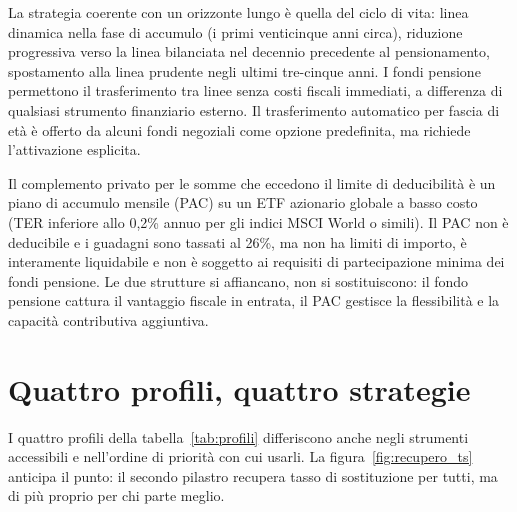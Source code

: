 \medskip
\noindent
La strategia coerente con un orizzonte lungo è quella del ciclo di
vita: linea dinamica nella fase di accumulo (i primi venticinque
anni circa), riduzione progressiva verso la linea bilanciata nel
decennio precedente al pensionamento, spostamento alla linea prudente
negli ultimi tre-cinque anni. I fondi pensione permettono il
trasferimento tra linee senza costi fiscali immediati, a differenza
di qualsiasi strumento finanziario esterno. Il trasferimento
automatico per fascia di età è offerto da alcuni fondi negoziali
come opzione predefinita, ma richiede l'attivazione esplicita.

\medskip
\noindent
Il complemento privato per le somme che eccedono il limite di
deducibilità è un piano di accumulo mensile (PAC) su un ETF azionario
globale a basso costo (TER inferiore allo 0,2\% annuo per gli indici
MSCI World o simili). Il PAC non è deducibile e i guadagni sono
tassati al 26\%, ma non ha limiti di importo, è interamente
liquidabile e non è soggetto ai requisiti di partecipazione minima
dei fondi pensione. Le due strutture si affiancano, non si
sostituiscono: il fondo pensione cattura il vantaggio fiscale in
entrata, il PAC gestisce la flessibilità e la capacità contributiva
aggiuntiva.

\section{Quattro profili, quattro strategie}
\label{sec:strategie_profili}

\noindent
I quattro profili della tabella~\ref{tab:profili} differiscono anche negli strumenti
accessibili e nell'ordine di priorità con cui usarli. La
figura~\ref{fig:recupero_ts} anticipa il punto: il secondo pilastro recupera tasso
di sostituzione per tutti, ma di più proprio per chi parte meglio.


